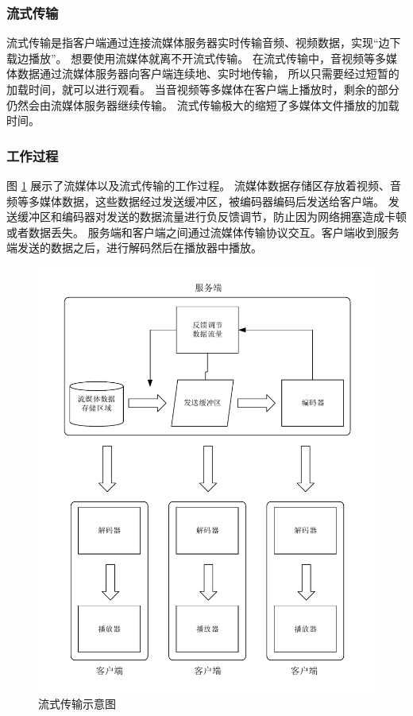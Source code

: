 \subsubsection{流式传输}
流式传输是指客户端通过连接流媒体服务器实时传输音频、视频数据，实现“边下载边播放”。
想要使用流媒体就离不开流式传输。
在流式传输中，音视频等多媒体数据通过流媒体服务器向客户端连续地、实时地传输，
所以只需要经过短暂的加载时间，就可以进行观看\cite{贺雪晨2008多媒体技术实用教程}。
当音视频等多媒体在客户端上播放时，剩余的部分仍然会由流媒体服务器继续传输。
流式传输极大的缩短了多媒体文件播放的加载时间。

\subsubsection{工作过程}
图 \ref{Fig:server} 展示了流媒体以及流式传输的工作过程。
流媒体数据存储区存放着视频、音频等多媒体数据，这些数据经过发送缓冲区，被编码器编码后发送给客户端。
发送缓冲区和编码器对发送的数据流量进行负反馈调节，防止因为网络拥塞造成卡顿或者数据丢失。
服务端和客户端之间通过流媒体传输协议交互。客户端收到服务端发送的数据之后，进行解码然后在播放器中播放。

\begin{figure}[ht]
    \centering
    \includegraphics[width=0.8\linewidth]{./Figure/IMG_server.pdf}
    \caption{流式传输示意图}
    \label{Fig:server}
\end{figure}

